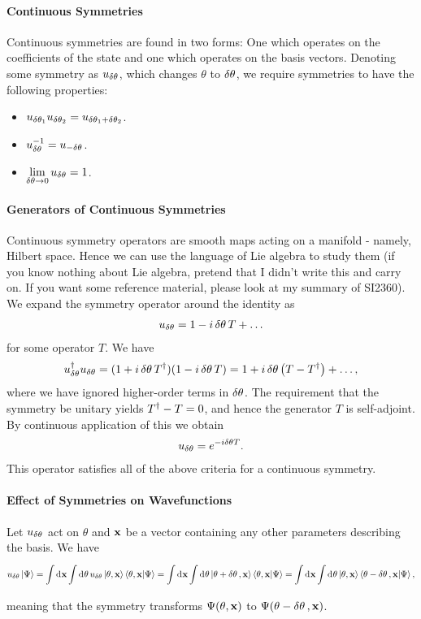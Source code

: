 \paragraph{Continuous Symmetries}
Continuous symmetries are found in two forms: One which operates on the coefficients of the state and one which operates on the basis vectors. Denoting some symmetry as $u_{\var{\theta}}$, which changes $\theta$ to $\var{\theta}$, we require symmetries to have the following properties:
\begin{itemize}
	\item $u_{\var{\theta_{1}}}u_{\var{\theta_{2}}} = u_{\var{\theta_{1}} + \var{\theta_{2}}}$.
	\item $u_{\var{\theta}}^{-1} = u_{-\var{\theta}}$.
	\item $\lim\limits_{\var{\theta} \to 0}u_{\var{\theta}} = 1$.
\end{itemize}

\paragraph{Generators of Continuous Symmetries}
Continuous symmetry operators are smooth maps acting on a manifold - namely, Hilbert space. Hence we can use the language of Lie algebra to study them (if you know nothing about Lie algebra, pretend that I didn't write this and carry on. If you want some reference material, please look at my summary of SI2360). We expand the symmetry operator around the identity as
\begin{align*}
	u_{\var{\theta}} = 1 - i\var{\theta}T + \dots
\end{align*}
for some operator $T$. We have
\begin{align*}
	u_{\var{\theta}}^{\dagger}u_{\var{\theta}} = (1 + i\var{\theta}T^{\dagger})(1 - i\var{\theta}T) = 1 + i\var{\theta}\left(T - T^{\dagger}\right) + \dots,
\end{align*}
where we have ignored higher-order terms in $\var{\theta}$. The requirement that the symmetry be unitary yields $T^{\dagger} - T = 0$, and hence the generator $T$ is self-adjoint. By continuous application of this we obtain
\begin{align*}
	u_{\var{\theta}} = e^{-i\var{\theta}T}.
\end{align*}
This operator satisfies all of the above criteria for a continuous symmetry.

\paragraph{Effect of Symmetries on Wavefunctions}
Let $u_{\var{\theta}}$ act on $\theta$ and $\vb{x}$ be a vector containing any other parameters describing the basis. We have
\begin{align*}
	u_{\var{\theta}}\ket{\Psi} = \int\limits_{}^{}\dd[]{\vb{x}}\int\limits_{}^{}\dd[]{\theta}u_{\var{\theta}}\ket{\theta, \vb{x}}\braket{\theta, \vb{x}}{\Psi} = \int\limits_{}^{}\dd[]{\vb{x}}\int\limits_{}^{}\dd[]{\theta}\ket{\theta + \var{\theta}, \vb{x}}\braket{\theta, \vb{x}}{\Psi} = \int\limits_{}^{}\dd[]{\vb{x}}\int\limits_{}^{}\dd[]{\theta}\ket{\theta, \vb{x}}\braket{\theta - \var{\theta}, \vb{x}}{\Psi},
\end{align*}
meaning that the symmetry transforms $\Psi(\theta, \vb{x})$ to $\Psi(\theta - \var{\theta}, \vb{x})$.

